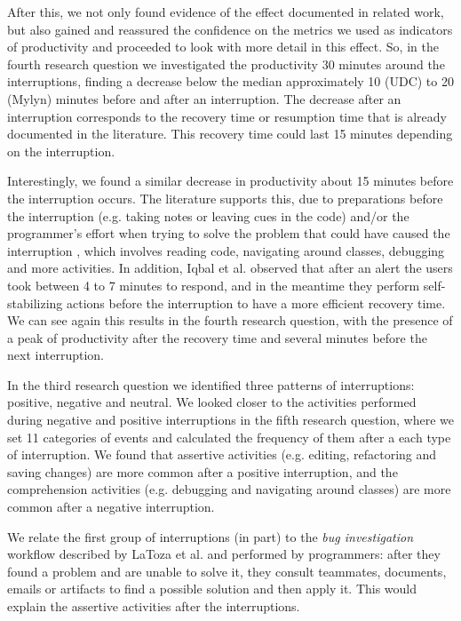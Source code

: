\documentclass[times]{smrauth}
\begin{document}
After this, we not only found evidence of the effect documented in related work, but also gained and reassured the confidence on the metrics we used as indicators of productivity and proceeded to look with more detail in this effect. So, in the fourth research question we investigated the productivity 30 minutes around the interruptions, finding a decrease below the median approximately 10 (UDC) to 20 (Mylyn) minutes before and after an interruption. The decrease after an interruption corresponds to the recovery time or resumption time that is already documented in the literature. This recovery time could last 15 minutes \cite{IH07, SBV98} depending on the interruption.

Interestingly, we found a similar decrease in productivity about 15 minutes before the interruption occurs. The literature supports this, due to preparations before the interruption \cite{LVD06} (e.g. taking notes or leaving cues in the code) and/or the programmer's effort when trying to solve the problem that could have caused the interruption \cite{PD10}, which involves reading code, navigating around classes, debugging and more activities. In addition, Iqbal et al.  \cite{IH07} observed that after an alert the users took between 4 to 7 minutes to respond, and in the meantime they perform self-stabilizing actions before the interruption to have a more efficient recovery time. We can see again this results in the fourth research question, with the presence of a peak of productivity after the recovery time and several minutes before the next interruption.

In the third research question we identified three patterns of interruptions: positive, negative and neutral. We looked closer to the activities performed during negative and positive interruptions in the fifth research question, where we set 11 categories of events and calculated the frequency of them after a each type of interruption. We found that assertive activities (e.g. editing, refactoring and saving changes) are more common after a positive interruption, and the comprehension activities (e.g. debugging and navigating around classes) are more common after a negative interruption. 

We relate the first group of interruptions (in part) to the \textit{bug investigation} workflow described by LaToza et al. \cite{LVD06} and performed by programmers: after they found a problem and are unable to solve it, they consult teammates, documents, emails or artifacts to find a possible solution and then apply it. This would explain the assertive activities after the interruptions.
\end{document}
